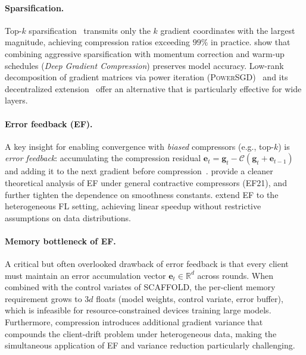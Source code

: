 \paragraph{Sparsification.}
Top-$k$ sparsification~\citep{lin2018deep,shi2019understanding}
transmits only the $k$ gradient coordinates with the largest magnitude,
achieving compression ratios exceeding $99\%$ in practice.
\citet{lin2018deep} show that combining aggressive sparsification with
momentum correction and warm-up schedules (\emph{Deep Gradient
Compression}) preserves model accuracy.
Low-rank decomposition of gradient matrices via power iteration
(\textsc{PowerSGD})~\citep{vogels2019powersgd} and its decentralized
extension~\citep{vogels2020powergossip} offer an alternative that is
particularly effective for wide layers.

\paragraph{Error feedback (EF).}
A key insight for enabling convergence with \emph{biased} compressors
(e.g., top-$k$) is \emph{error feedback}: accumulating the compression
residual $\mathbf{e}_t = \mathbf{g}_t - \mathcal{C}(\mathbf{g}_t +
\mathbf{e}_{t-1})$ and adding it to the next gradient before
compression~\citep{stich2018sparsified}.
\citet{richtarik2021ef21} provide a cleaner theoretical analysis of EF
under general contractive compressors (\textsc{EF21}), and
\citet{richtarik2024ef_reloaded} further tighten the dependence on
smoothness constants.
\citet{bao2025efskip} extend EF to the heterogeneous FL setting,
achieving linear speedup without restrictive assumptions on data
distributions.

\paragraph{Memory bottleneck of EF.}
A critical but often overlooked drawback of error feedback is that
every client must maintain an error accumulation vector
$\mathbf{e}_t \in \mathbb{R}^d$ across rounds.
When combined with the control variates of \textsc{SCAFFOLD}, the
per-client memory requirement grows to $3d$ floats (model weights,
control variate, error buffer), which is infeasible for
resource-constrained devices training large models.
Furthermore, compression introduces additional gradient variance that
compounds the client-drift problem under heterogeneous data, making the
simultaneous application of EF and variance reduction particularly
challenging.

